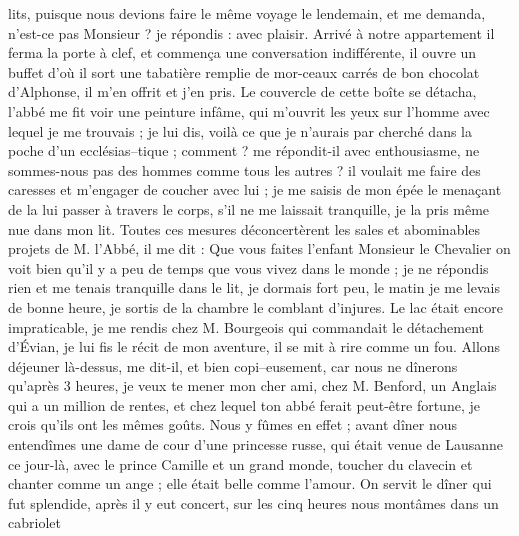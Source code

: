 \documentclass[12pt]{article}
\begin{document}
 lits, puisque nous devions faire le même voyage le
lendemain, et me demanda, n’est-ce pas Monsieur ? je répondis : avec plaisir. Arrivé à notre
appartement il ferma la porte à clef, et commença une conversation indifférente, il ouvre un buffet
d’où il sort une tabatière remplie de mor-ceaux carrés de bon chocolat d’Alphonse, il m’en offrit et
j’en pris. Le couvercle de cette boîte se détacha, l’abbé me fit voir une peinture infâme, qui
m’ouvrit les yeux sur l’homme avec lequel je me trouvais ; je lui dis, voilà ce que je n’aurais par
cherché dans la poche d’un ecclésias–tique ; comment ? me répondit-il avec enthousiasme, ne
sommes-nous pas des hommes comme tous les autres ? il voulait me faire des caresses et m’engager de
coucher avec lui ; je me saisis de mon épée le menaçant de la lui passer à travers le corps, s’il ne
me laissait tranquille, je la pris même nue dans mon lit. Toutes ces mesures déconcertèrent les
sales et abominables projets de M. l’Abbé, il me dit : Que vous faites l’enfant Monsieur le
Chevalier on voit bien qu’il y a peu de temps que vous vivez dans le monde ; je ne répondis rien et
me tenais tranquille dans le lit, je dormais fort peu, le matin je me levais de bonne heure, je
sortis de la chambre le comblant d’injures. Le lac était encore impraticable, je me rendis chez M.
Bourgeois qui commandait le détachement d’Évian, je lui fis le récit de mon aventure, il se mit à
rire comme un fou. Allons déjeuner là-dessus, me dit-il, et bien copi–eusement, car nous ne dînerons
qu’après 3 heures, je veux te mener mon cher ami, chez M. Benford, un Anglais qui a un million de
rentes, et chez lequel ton abbé ferait peut-être fortune, je crois qu’ils ont les mêmes goûts. Nous
y fûmes en effet ; avant dîner nous entendîmes une dame de cour d’une princesse russe, qui était
venue de Lausanne ce jour-là, avec le prince Camille et un grand monde, toucher du clavecin et
chanter comme un ange ; elle était belle comme l’amour. On servit le dîner qui fut splendide, après
il y eut concert, sur les cinq heures nous montâmes dans un cabriolet
\end{document}
